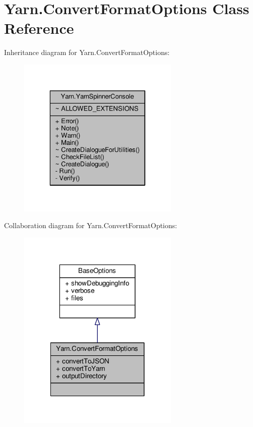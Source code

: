 \hypertarget{a00060}{\section{Yarn.\-Convert\-Format\-Options Class Reference}
\label{a00060}
}


Inheritance diagram for Yarn.\-Convert\-Format\-Options\-:
\nopagebreak
\begin{figure}[H]
\begin{center}
\leavevmode
\includegraphics[width=218pt]{a00756}
\end{center}
\end{figure}


Collaboration diagram for Yarn.\-Convert\-Format\-Options\-:
\nopagebreak
\begin{figure}[H]
\begin{center}
\leavevmode
\includegraphics[width=218pt]{a00757}
\end{center}
\end{figure}

